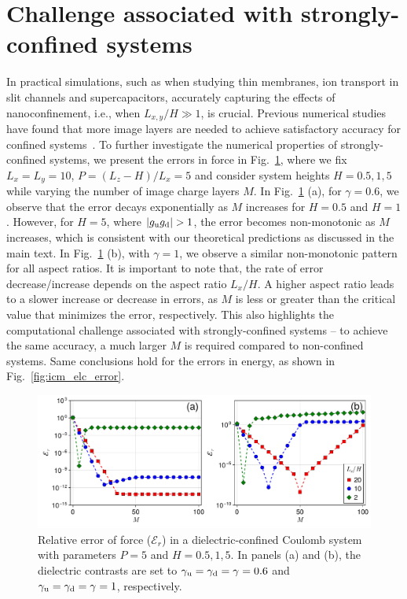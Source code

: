 \section{Challenge associated with strongly-confined systems}
In practical simulations, such as when studying thin membranes, ion transport in slit channels and supercapacitors, accurately capturing the effects of nanoconfinement, i.e., when $L_{x,y} / H\gg 1$, is crucial.
Previous numerical studies have found that more image layers are needed to achieve satisfactory accuracy for confined systems~\cite{dos2015electrolytes}. 
To further investigate the numerical properties of strongly-confined systems, we present the errors in force in Fig.~\ref{fig:icm_elc_error_force}, where we fix $L_x=L_y=10$, $P=(L_z-H)/L_x = 5$ and consider system heights $H = 0.5, 1, 5$ while varying the number of image charge layers $M$. 
In Fig.~\ref{fig:icm_elc_error_force} (a), for $\gamma = 0.6$, we observe that the error decays exponentially as $M$ increases for $H = 0.5$ and $H = 1$. 
However, for $H = 5$, where $|g_{\T u}g_{\T d}|>1$, the error becomes non-monotonic as $M$ increases, 
which is consistent with our theoretical predictions as discussed in the main text.
In Fig.~\ref{fig:icm_elc_error_force} (b), with $\gamma = 1$, we observe a similar non-monotonic pattern for all aspect ratios. 
It is important to note that, the rate of error decrease/increase depends on the aspect ratio $L_x/H$. 
A higher aspect ratio leads to a slower increase or decrease in errors, as $M$ is less or greater than the critical value that minimizes the error, respectively. 
This also highlights the computational challenge associated with strongly-confined systems -- to achieve the same accuracy, a much larger $M$ is required compared to non-confined systems.
Same conclusions hold for the errors in energy, as shown in Fig.~\ref{fig:icm_elc_error}.

\begin{figure}[htbp]
    \centering
    \includegraphics[width=0.98\linewidth]{figs/icm_elc_error_force.pdf}
    \caption{Relative error of force ($\mathcal{E}_r$) in a dielectric-confined Coulomb system with parameters $P = 5$ and $H = 0.5, 1, 5$. In panels (a) and (b), the dielectric contrasts are set to $\gamma_{\text{u}} = \gamma_{\text{d}} = \gamma = 0.6$ and $\gamma_{\text{u}} = \gamma_{\text{d}} = \gamma = 1$, respectively.}
    \label{fig:icm_elc_error_force}
\end{figure}

